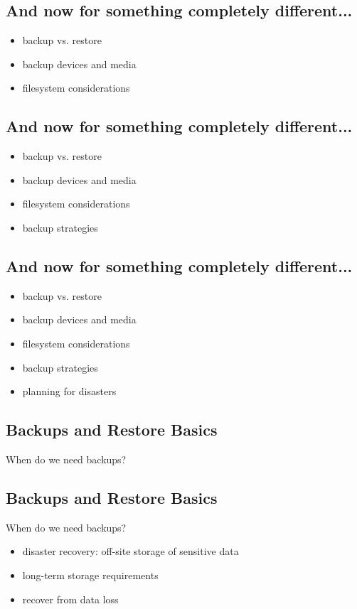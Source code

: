 \documentclass[xga]{xdvislides}
\begin{document}
\subsection{And now for something completely different...}
\begin{itemize}
	\item backup vs. restore
	\item backup devices and media
	\item filesystem considerations
\end{itemize}

\subsection{And now for something completely different...}
\begin{itemize}
	\item backup vs. restore
	\item backup devices and media
	\item filesystem considerations
	\item backup strategies
\end{itemize}

\subsection{And now for something completely different...}
\begin{itemize}
	\item backup vs. restore
	\item backup devices and media
	\item filesystem considerations
	\item backup strategies
	\item planning for disasters
\end{itemize}

\subsection{Backups and Restore Basics}
When do we need backups?

\subsection{Backups and Restore Basics}
When do we need backups?
\begin{itemize}
	\item disaster recovery: off-site storage of sensitive data
	\item long-term storage requirements
	\item recover from data loss
\end{itemize}
\end{document}

